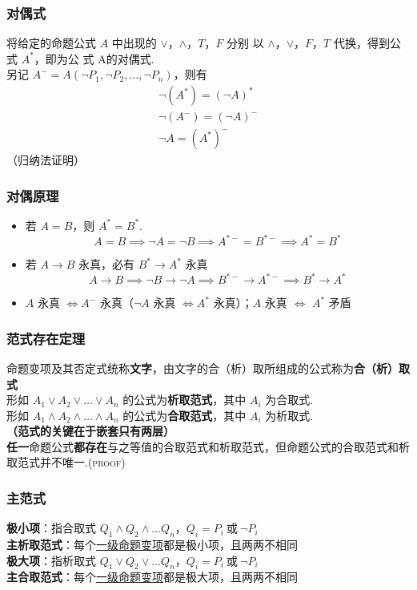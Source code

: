 \documentclass[./main.tex]{subfiles}
\begin{document}
\subsubsection{对偶式}
将给定的命题公式 $A$ 中出现的 $\vee$，$\wedge$，$T$，$F$ 分别
以 $\wedge$，$\vee$，$F$，$T$ 代换，得到公式 $A^*$，即为公
式 A的对偶式.\\
\indent 另记 $A^-=A(\neg P_1,\neg P_2,\dots,\neg P_n)$，则有
\begin{gather}
    \neg(A^*)=(\neg A)^*\\
    \neg(A^-)=(\neg A)^-\\
    \neg A=(A^*)^-
\end{gather}（归纳法证明）
\subsubsection{对偶原理}
\begin{itemize}
\item 若 $A=B$，则 $A^*=B^*$.
\begin{equation}
    A=B\implies \neg A=\neg B\implies A^{*-}=B^{*-}\implies A^*=B^*
\end{equation}
\item 若 $A\rightarrow B$ 永真，必有 $B^*\rightarrow A^*$ 永真
\begin{equation}
    A\rightarrow B\implies \neg B\rightarrow\neg A\implies B^{*-}\rightarrow A^{*-}\implies B^*\rightarrow A^*
\end{equation}
\item $A$ 永真 $\Leftrightarrow A^-$ 永真（$\neg A$ 永真 $\Leftrightarrow A^*$ 永真）；$A$ 永真 $\Leftrightarrow$ $A^*$ 矛盾
\end{itemize}
\subsubsection{范式存在定理}
命题变项及其否定式统称\textbf{文字}，由文字的合（析）取所组成的公式称为\textbf{合（析）取式}\\
\indent {}形如 $A_1\vee A_2\vee\dots\vee A_n$ 的公式为\textbf{析取范式}，其中 $A_i$ 为合取式. \\
\indent {}形如 $A_1\wedge A_2\wedge\dots\wedge A_n$ 的公式为\textbf{合取范式}，其中 $A_i$ 为析取式. \\
\indent \textbf{（范式的关键在于嵌套只有两层）}\\
\indent \textbf{任一}命题公式\textbf{都存在}与之等值的合取范式和析取范式，但命题公式的合取范式和析取范式并不唯一.\hfill(\textsc{proof})
\subsubsection{主范式}
\textbf{极小项}：指合取式 $Q_1\wedge Q_2\wedge\dots Q_n$，$Q_i=P_i\ \text{或}\ \neg P_i$\\
\indent \textbf{主析取范式}：每个\underline{一级命题变项}都是极小项，且两两不相同\\
\indent \textbf{极大项}：指析取式 $Q_1\vee Q_2\vee\dots Q_n$，$Q_i=P_i\ \text{或}\ \neg P_i$\\
\indent \textbf{主合取范式}：每个\underline{一级命题变项}都是极大项，且两两不相同
\end{document}
